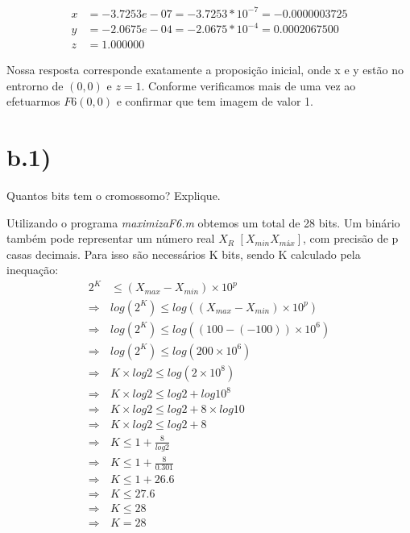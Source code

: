 \documentclass{article}
\begin{document}
\begin{equation}
\begin{split}
	x &= -3.7253e-07 = -3.7253*10^{-7} = -0.0000003725 \\
	y &= -2.0675e-04 = -2.0675*10^{-4} = 0.0002067500 \\
	z &= 1.000000
\end{split}
\end{equation}



\begin{flushleft}
	Nossa resposta corresponde exatamente a proposição inicial,
	onde x e y estão no entrorno de $(0,0)$ e $z = 1$. Conforme
	verificamos mais de uma vez ao efetuarmos $F6(0,0)$ e
	confirmar que tem imagem de valor 1.
\end{flushleft}

\newpage
\section*{b.1)}
\begin{flushleft}
	Quantos bits tem o cromossomo? Explique.

	Utilizando o programa \emph{maximizaF6.m} obtemos um total de 28 bits.
	Um binário também pode representar um número real $X_{R}$
	$[X_{min}X_{máx}]$, com precisão de p casas decimais. Para isso são
	necessários K bits, sendo K calculado pela inequação:
	\begin{equation}
	\begin{split}
		2^{K} &\leq (X_{max}-X_{min})\times 10^{p}\\
		\Rightarrow & log (2^{K}) \leq log ((X_{max}-X_{min})\times 10^{p}) \\
		\Rightarrow & log (2^{K}) \leq log ((100-(-100))\times 10^{6}) \\
		\Rightarrow & log (2^{K}) \leq log (200\times 10^{6}) \\
		\Rightarrow & K \times log 2 \leq log (2\times 10^{8}) \\
		\Rightarrow & K \times log 2 \leq log 2 + log 10^{8} \\
		\Rightarrow & K \times log 2 \leq log 2 + 8\times log 10 \\
		\Rightarrow & K \times log 2 \leq log 2 + 8 \\
		\Rightarrow & K \leq 1 + \frac{8}{log 2} \\
		\Rightarrow & K \leq 1 + \frac{8}{0.301} \\
		\Rightarrow & K \leq 1 + 26.6 \\
		\Rightarrow & K \leq 27.6 \\
		\Rightarrow & K \leq 28 \\
		\Rightarrow & K = 28
	\end{split}
	\end{equation}

\end{flushleft}
\end{document}
